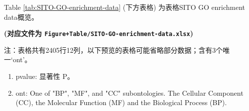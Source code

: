 \documentclass[
]{article}
\providecommand{\tightlist}{%
  \setlength{\itemsep}{0pt}\setlength{\parskip}{0pt}}
\begin{document}
Table \ref{tab:SITO-GO-enrichment-data} (下方表格) 为表格SITO GO enrichment data概览。

\textbf{(对应文件为 \texttt{Figure+Table/SITO-GO-enrichment-data.xlsx})}

\begin{center}\begin{tcolorbox}[colback=gray!10, colframe=gray!50, width=0.9\linewidth, arc=1mm, boxrule=0.5pt]注：表格共有2405行12列，以下预览的表格可能省略部分数据；含有3个唯一`ont'。
\end{tcolorbox}
\end{center}
\begin{center}\begin{tcolorbox}[colback=gray!10, colframe=gray!50, width=0.9\linewidth, arc=1mm, boxrule=0.5pt]\begin{enumerate}\tightlist
\item pvalue:  显著性 P。
\item ont:  One of "BP", "MF", and "CC" subontologies. The Cellular Component (CC), the Molecular Function (MF) and the Biological Process (BP).
\end{enumerate}\end{tcolorbox}
\end{center}
\end{document}
